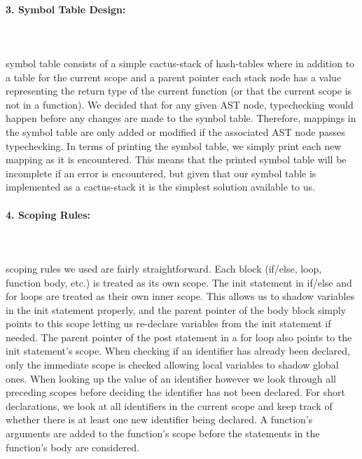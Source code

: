 \documentclass{article}
\begin{document}
\paragraph{3. Symbol Table Design:}\mbox{}\\\\
 symbol table consists of a simple cactus-stack of hash-tables where in addition to a table for the current scope and a parent pointer each stack node has a value representing the return type of the current function (or that the current scope is not in a function). We decided that for any given AST node, typechecking would happen before any changes are made to the symbol table. Therefore, mappings in the symbol table are only added or modified if the associated AST node passes typechecking. In terms of printing the symbol table, we simply print each new mapping as it is encountered. This means that the printed symbol table will be incomplete if an error is encountered, but given that our symbol table is implemented as a cactus-stack it is the simplest solution available to us.
\paragraph{4. Scoping Rules:}\mbox{}\\\\
 scoping rules we used are fairly straightforward. Each block (if/else, loop, function body, etc.) is treated as its own scope. The init statement in if/else and for loops are treated as their own inner scope. This allows us to shadow variables in the init statement properly, and the parent pointer of the body block simply points to this scope letting us re-declare variables from the init statement if needed. The parent pointer of the post statement in a for loop also points to the init statement's scope. When checking if an identifier has already been declared, only the immediate scope is checked allowing local variables to shadow global ones. When looking up the value of an identifier however we look through all preceding scopes before deciding the identifier has not been declared. For short declarations, we look at all identifiers in the current scope and keep track of whether there is at least one new identifier being declared. A function's arguments are added to the function's scope before the statements in the function's body are considered.
\end{document}

